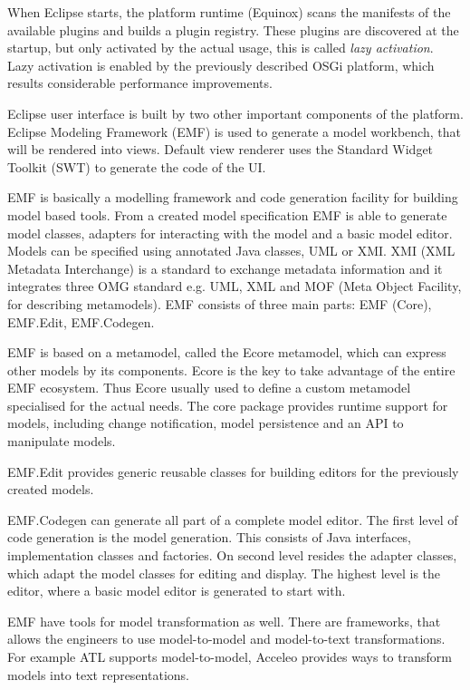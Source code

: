 When Eclipse starts, the platform runtime (Equinox) scans the manifests of the available plugins and builds a plugin registry. These plugins are discovered at the startup, but only activated by the actual usage, this is called \textit{lazy activation}. Lazy activation is enabled by the previously described OSGi platform, which results considerable performance improvements.

Eclipse user interface is built by two other important components of the platform. Eclipse Modeling Framework (EMF) is used to generate a model workbench, that will be rendered into views. Default view renderer uses the Standard Widget Toolkit (SWT) to generate the code of the UI.

EMF is basically a modelling framework and code generation facility for building model based tools. From a created model specification EMF is able to generate model classes, adapters for interacting with the model and a basic model editor.  Models can be specified using annotated Java classes, UML or XMI. XMI (XML Metadata Interchange) is a standard to exchange metadata information and it integrates three OMG standard e.g. UML, XML and MOF (Meta Object Facility, for describing metamodels). EMF consists of three main parts: EMF (Core), EMF.Edit, EMF.Codegen.

EMF is based on a metamodel, called the Ecore metamodel, which can express other models by its components. Ecore is the key to take advantage of the entire EMF ecosystem. Thus Ecore usually used to define a custom metamodel specialised for the actual needs. The core package provides runtime support for models, including change notification, model persistence and an API to manipulate models.

EMF.Edit provides generic reusable classes for building editors for the previously created models.

EMF.Codegen can generate all part of a complete model editor. The first level of code generation is the model generation. This consists of Java interfaces, implementation classes and factories. On second level resides the adapter classes, which adapt the model classes for editing and display. The highest level is the editor, where a basic model editor is generated to start with.

EMF have tools for model transformation as well. There are frameworks, that allows the engineers to use model-to-model and model-to-text transformations. For example ATL supports model-to-model, Acceleo provides ways to transform models into text representations.



